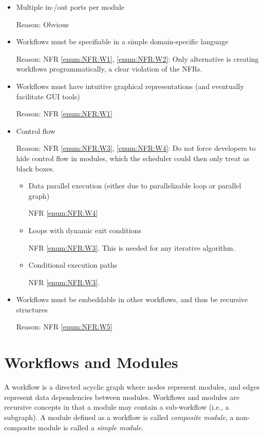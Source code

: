 \begin{itemize}
	\item Multiple in-/out ports per module
	
		Reason: Obvious

	\item Workflows must be specifiable in a simple domain-specific language

		Reason: NFR \ref{enum:NFR:W1}, \ref{enum:NFR:W2}: Only alternative is creating workflows programmatically, a clear violation of the NFRs.

	\item Workflows must have intuitive graphical representations (and eventually facilitate GUI tools)
		
		Reason: NFR \ref{enum:NFR:W1}

	\item Control flow

		Reason: NFR \ref{enum:NFR:W3}, \ref{enum:NFR:W4}: Do not force developers to hide control flow in modules, which the scheduler could then only treat as black boxes.
		\begin{itemize}
			\item Data parallel execution (either due to parallelizable loop or parallel graph) 

				NFR \ref{enum:NFR:W4}
			\item Loops with dynamic exit conditions

				NFR \ref{enum:NFR:W3}. This is needed for any iterative algorithm.
			\item Conditional execution paths

				NFR \ref{enum:NFR:W3}.
		\end{itemize}
	\item Workflows must be embeddable in other workflows, and thus be recursive structures
		
		Reason: NFR \ref{enum:NFR:W5}
\end{itemize}

\section{Workflows and Modules}

A workflow is a directed acyclic graph where nodes represent modules, and edges represent data dependencies between modules. Workflows and modules are recursive concepts in that a module may contain a sub-workflow (i.e., a subgraph). A module defined as a workflow is called \emph{composite module}, a non-composite module is called a \emph{simple module}.

